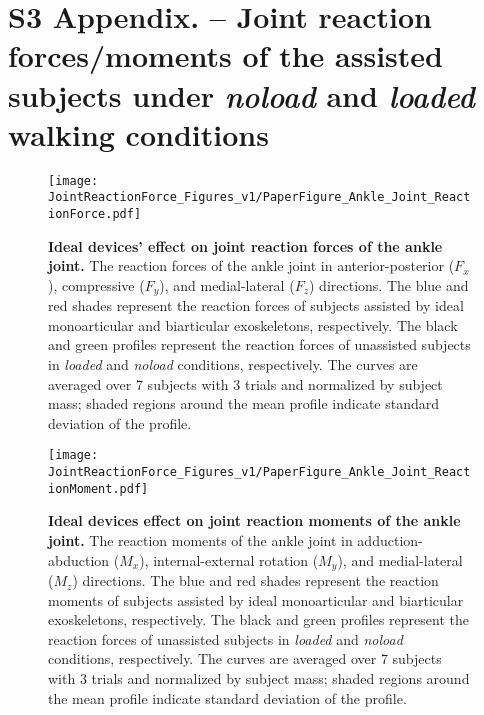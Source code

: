 \documentclass[10pt,letterpaper]{article}
\renewcommand{\figurename}{Fig}
\begin{document}
\section*{S3 Appendix. -- Joint reaction forces/moments of the assisted subjects under \textit{noload} and \textit{loaded} walking conditions} %
\renewcommand{\figurename}{Fig}
\renewcommand{\thefigure}{B\arabic{figure}}
\setcounter{figure}{0}
\bigskip
\bigskip
\bigskip
\bigskip
\nolinenumbers
\begin{figure*}[h!]
	\centering \texttt{[image: JointReactionForce\_Figures\_v1/PaperFigure\_Ankle\_Joint\_ReactionForce.pdf]}
	\vspace{1mm}
	\caption{\small{\textbf{Ideal devices' effect on joint reaction forces of the ankle joint.}} The reaction forces of the ankle joint in anterior-posterior ($F_x$), compressive ($F_y$), and medial-lateral ($F_z$) directions. The blue and red shades represent the reaction forces of subjects assisted by ideal monoarticular and biarticular exoskeletons, respectively. The black and green profiles represent the reaction forces of unassisted subjects in {\it loaded} and {\it noload} conditions, respectively. The curves are averaged over 7 subjects with 3 trials and normalized by subject mass; shaded regions around the mean profile indicate standard deviation of the profile.}
	\label{Fig_Ankle_ReactionForces}
\end{figure*}
\begin{figure*}[h!]
	\centering
	\texttt{[image: JointReactionForce\_Figures\_v1/PaperFigure\_Ankle\_Joint\_ReactionMoment.pdf]}
	\vspace{1mm}
	\caption{\small{\textbf{Ideal devices effect on joint reaction moments of the ankle joint.}} The reaction moments of the ankle joint in adduction-abduction ($M_x$), internal-external rotation ($M_y$), and medial-lateral ($M_z$) directions. The blue and red shades represent the reaction moments of subjects assisted by ideal monoarticular and biarticular exoskeletons, respectively. The black and green profiles represent the reaction forces of unassisted subjects in {\it loaded} and {\it noload} conditions, respectively. The curves are averaged over 7 subjects with 3 trials and normalized by subject mass; shaded regions around the mean profile indicate standard deviation of the profile.}
	\label{Fig_Ankle_ReactionMomentss}
\end{figure*}
\end{document}
